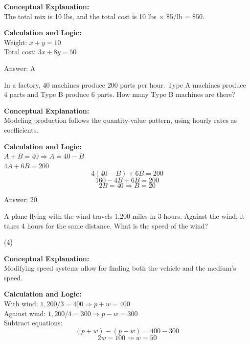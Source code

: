 \documentclass[11pt,paper=a4,answers]{exam}
\begin{document}
\begin{questions}
\begin{solution}
\textbf{Conceptual Explanation:} \\
The total mix is 10 lbs, and the total cost is 10 lbs $\times$ \$5/lb = \$50.

\vspace{10pt}
\textbf{Calculation and Logic:} \\
Weight: $x + y = 10$ \\
Total cost: $3x + 8y = 50$

\vspace{15pt}
Answer: \colorbox{yellow!100}{A}
\end{solution}

\question
In a factory, 40 machines produce 200 parts per hour. Type A machines produce 4 parts and Type B produce 6 parts. How many Type B machines are there?

\begin{solution}
\textbf{Conceptual Explanation:} \\
Modeling production follows the quantity-value pattern, using hourly rates as coefficients.

\vspace{10pt}
\textbf{Calculation and Logic:} \\
$A + B = 40 \Rightarrow A = 40 - B$ \\
$4A + 6B = 200$ \\
\[4(40 - B) + 6B = 200\]
\[160 - 4B + 6B = 200\]
\[2B = 40 \Rightarrow B = 20\]

\vspace{15pt}
Answer: \colorbox{yellow!100}{20}
\end{solution}

\question
A plane flying with the wind travels 1,200 miles in 3 hours. Against the wind, it takes 4 hours for the same distance. What is the speed of the wind?
\begin{tasks}(4)
\end{tasks}

\begin{solution}
\textbf{Conceptual Explanation:} \\
Modifying speed systems allow for finding both the vehicle and the medium's speed.

\vspace{10pt}
\textbf{Calculation and Logic:} \\
With wind: $1,200 / 3 = 400 \Rightarrow p + w = 400$ \\
Against wind: $1,200 / 4 = 300 \Rightarrow p - w = 300$ \\
Subtract equations:
\[(p + w) - (p - w) = 400 - 300\]
\[2w = 100 \Rightarrow w = 50\]


\end{solution}
\end{questions}
\end{document}
